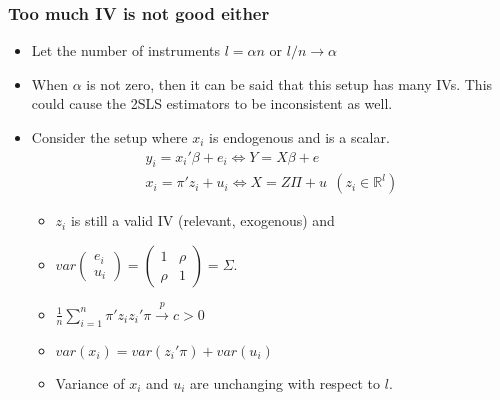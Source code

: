 \documentclass[aspectratio=169]{beamer}
\begin{document}
\begin{frame}
\frametitle{Too much IV is not good either}
\begin{itemize}
\item Let the number of instruments $l=\alpha n$ or $l/n \to \alpha $
\item When $\alpha$ is not zero, then it can be said that this setup has many IVs. This could cause the 2SLS estimators to be inconsistent as well.
\item Consider the setup where $x_i$ is endogenous and is a scalar. 
\begin{gather*}
y_ i = x_i'\beta+e_i \iff Y=X\beta+e \\
x_i = \pi'z_i+u_i \iff X=Z\Pi+u \ \ (z_i \in \mathbb{R}^l)
\end{gather*}
\begin{itemize}
\item $z_i$ is still a valid IV (relevant, exogenous) and 
\item $var\begin{pmatrix} e_i \\ u_i \end{pmatrix} = \begin{pmatrix}1 & \rho \\ \rho & 1 \end{pmatrix} = \Sigma$. 
\item $\frac{1}{n}\sum_{i=1}^n \pi'z_iz_i'\pi\xrightarrow{p}c>0$
\item $var(x_i) = var(z_i'\pi)+var(u_i)$
\item Variance of $x_i$ and $u_i$ are unchanging with respect to $l$. 
\end{itemize}
\end{itemize}
\end{frame}
\end{document}

